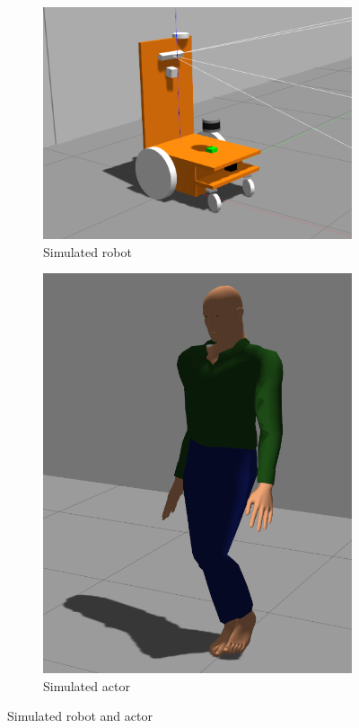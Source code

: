 \begin{figure}[H]
  \centering
  \begin{subfigure}{0.40\textwidth}
    \centering
    \includegraphics[keepaspectratio, scale=0.15]{images/sim-robot.png}
    \caption{Simulated robot}
    \label{Fig:sim-robot}
  \end{subfigure}
  \begin{subfigure}{0.40\textwidth}
    \centering
    \includegraphics[keepaspectratio, scale=0.15]{images/sim-actor.png}
    \caption{Simulated actor}
    \label{Fig:sim-actor}
  \end{subfigure}
  \caption{Simulated robot and actor}
  \label{Fig:sim-robot-actor}
\end{figure}

